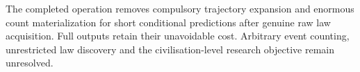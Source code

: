 \documentclass[11pt]{article}
\begin{document}
The completed operation removes compulsory trajectory expansion and enormous
count materialization for short conditional predictions after genuine raw law
acquisition. Full outputs retain their unavoidable cost. Arbitrary event
counting, unrestricted law discovery and the civilisation-level research
objective remain unresolved.
\end{document}
